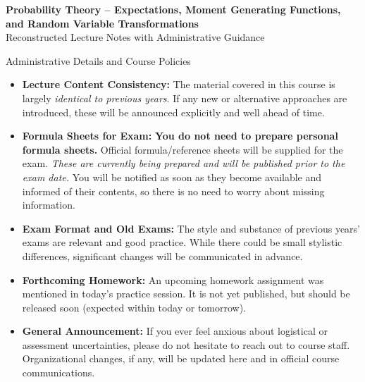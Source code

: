 \documentclass[12pt]{article}
\begin{document}
\begin{center}
    {\LARGE\bf Probability Theory -- Expectations, Moment Generating Functions,\\[2pt] and Random Variable Transformations}\\[1em]
    {\large Reconstructed Lecture Notes with Administrative Guidance}
\end{center}

\vspace{0.6em}


\begin{announcement}{Administrative Details and Course Policies}
    \begin{itemize}[leftmargin=2em]
        \item {\bf Lecture Content Consistency:} The material covered in this course is largely \textit{identical to previous years}. If any new or alternative approaches are introduced, these will be announced explicitly and well ahead of time.
        \item {\bf Formula Sheets for Exam:} \textbf{You do not need to prepare personal formula sheets.} Official formula/reference sheets will be supplied for the exam. \emph{These are currently being prepared and will be published prior to the exam date.} You will be notified as soon as they become available and informed of their contents, so there is no need to worry about missing information.
        \item {\bf Exam Format and Old Exams:} The style and substance of previous years' exams are relevant and good practice. While there could be small stylistic differences, significant changes will be communicated in advance.
        \item {\bf Forthcoming Homework:} An upcoming homework assignment was mentioned in today's practice session. It is not yet published, but should be released soon (expected within today or tomorrow).
        \item {\bf General Announcement:} If you ever feel anxious about logistical or assessment uncertainties, please do not hesitate to reach out to course staff. Organizational changes, if any, will be updated here and in official course communications.
    \end{itemize}
\end{announcement}

\vspace{1.0em}
\end{document}
